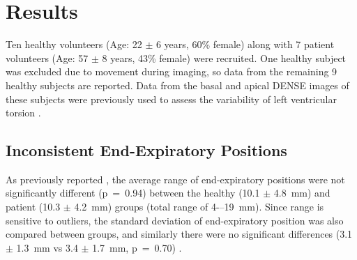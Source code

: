 \section{Results}
	Ten healthy volunteers (Age: 22 $\pm$ 6 years, 60\% female) along with 7 patient volunteers (Age: 57 $\pm$ 8 years, 43\% female) were recruited. One healthy subject was excluded due to movement during imaging, so data from the remaining 9 healthy subjects are reported. Data from the basal and apical DENSE images of these subjects were previously used to assess the variability of left ventricular torsion \cite{Hamlet2017}.
	
\subsection{Inconsistent End-Expiratory Positions}
	As previously reported \cite{Hamlet2017}, the average range of end-expiratory positions were not significantly different (p~=~0.94) between the healthy (10.1 $\pm$ 4.8~mm) and patient (10.3 $\pm$ 4.2~mm) groups (total range of 4-–19~mm). Since range is sensitive to outliers, the standard deviation of end-expiratory position was also compared between groups, and similarly there were no significant differences (3.1 $\pm$ 1.3~mm vs 3.4 $\pm$ 1.7~mm, p~=~0.70) \cite{Hamlet2017}.
	
